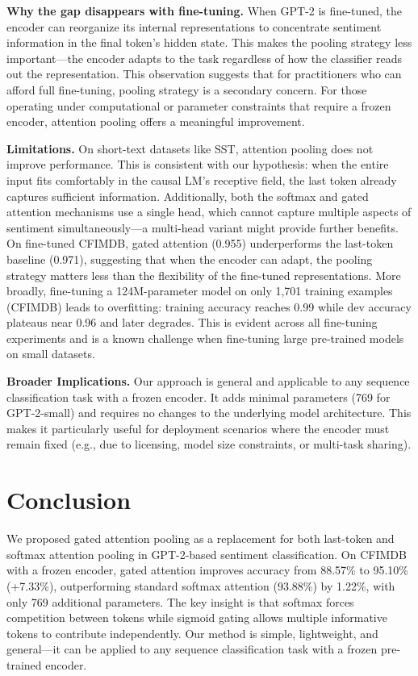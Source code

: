 \documentclass[9pt,twocolumn,twoside,lineno]{gsag3jnl}
\begin{document}
\textbf{Why the gap disappears with fine-tuning.} When GPT-2 is fine-tuned, the encoder can reorganize its internal representations to concentrate sentiment information in the final token's hidden state. This makes the pooling strategy less important---the encoder adapts to the task regardless of how the classifier reads out the representation. This observation suggests that for practitioners who can afford full fine-tuning, pooling strategy is a secondary concern. For those operating under computational or parameter constraints that require a frozen encoder, attention pooling offers a meaningful improvement.

\textbf{Limitations.} On short-text datasets like SST, attention pooling does not improve performance. This is consistent with our hypothesis: when the entire input fits comfortably in the causal LM's receptive field, the last token already captures sufficient information. Additionally, both the softmax and gated attention mechanisms use a single head, which cannot capture multiple aspects of sentiment simultaneously---a multi-head variant might provide further benefits. On fine-tuned CFIMDB, gated attention (0.955) underperforms the last-token baseline (0.971), suggesting that when the encoder can adapt, the pooling strategy matters less than the flexibility of the fine-tuned representations. More broadly, fine-tuning a 124M-parameter model on only 1,701 training examples (CFIMDB) leads to overfitting: training accuracy reaches 0.99 while dev accuracy plateaus near 0.96 and later degrades. This is evident across all fine-tuning experiments and is a known challenge when fine-tuning large pre-trained models on small datasets.

\textbf{Broader Implications.} Our approach is general and applicable to any sequence classification task with a frozen encoder. It adds minimal parameters (769 for GPT-2-small) and requires no changes to the underlying model architecture. This makes it particularly useful for deployment scenarios where the encoder must remain fixed (e.g., due to licensing, model size constraints, or multi-task sharing).

\section{Conclusion}

We proposed gated attention pooling as a replacement for both last-token and softmax attention pooling in GPT-2-based sentiment classification. On CFIMDB with a frozen encoder, gated attention improves accuracy from 88.57\% to 95.10\% (+7.33\%), outperforming standard softmax attention (93.88\%) by 1.22\%, with only 769 additional parameters. The key insight is that softmax forces competition between tokens while sigmoid gating allows multiple informative tokens to contribute independently. Our method is simple, lightweight, and general---it can be applied to any sequence classification task with a frozen pre-trained encoder.
\end{document}
